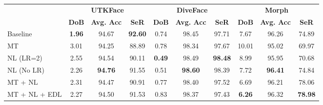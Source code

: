 \documentclass[runningheads]{llncs}
\begin{document}
\begin{table}
{\begin{tabular}{lccccccccc} 
\toprule
                     & \multicolumn{3}{c}{\textbf{UTKFace}}                                               & \multicolumn{3}{c}{\textbf{DiveFace}}                                              & \multicolumn{3}{c}{\textbf{Morph}}                                                  \\ 
\cmidrule(l){2-10}
                     & \textbf{DoB } & \textbf{Avg. Acc } & \textbf{SeR } & \textbf{DoB } & \textbf{Avg. Acc } & \textbf{SeR } & \textbf{DoB } & \textbf{Avg. Acc } & \textbf{SeR }  \\ 
\midrule
Baseline             & \textbf{1.96}                      & 94.67                        & \textbf{92.60}                   & 0.74                      & 98.45                        & 97.71                   & 7.67                      & 96.26                        & 74.89                    \\
MT                   & 3.01                      & 94.25                        & 88.89                   & 0.78                      & 98.34                        & 97.67                   & 10.01                     & 95.02                        & 69.97                    \\
NL (LR=2)            & 2.55                      & 94.54                        & 90.11                   & \textbf{0.49}             & 98.49                        & \textbf{98.48}          & 8.99                      & 95.95                        & 70.68                    \\
NL (No LR)           & 2.26                      & \textbf{94.76}                        & 91.55                   & 0.51                      & \textbf{98.60}               & 98.39                   & 7.72                      & \textbf{96.41}               & 74.84                    \\
MT + NL              & 2.31                      & 94.47                        & 90.91                   & 0.77                      & 98.40                        & 97.52                   & 6.69                      & 96.21                        & 78.06                    \\
MT + NL + EDL        & 2.27                      & 94.50                        & 91.53                   & 0.83                      & 98.37                        & 97.43                   & \textbf{6.26}             & 96.32                        & \textbf{78.98}           \\
\midrule

\end{tabular}}
\end{table}
\end{document}
